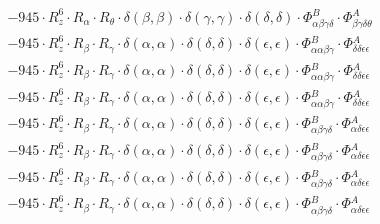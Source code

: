 \documentclass{article}
\begin{document}
\begin{subequations}
\begin{gather}
\begin{array}{c}
 \\[0.2em] 		 - 945 \cdot R_{z}^{6} \cdot R_{\alpha{}} \cdot R_{\theta{}} \cdot \delta{}\left(\beta{}, \beta{}\right) \cdot \delta{}\left(\gamma{}, \gamma{}\right) \cdot \delta{}\left(\delta{}, \delta{}\right) \cdot \Phi{}^{B}_{\alpha{}\beta{}\gamma{}\delta{}} \cdot \Phi{}^{A}_{\beta{}\gamma{}\delta{}\theta{}} 
 \\[0.2em] 		 - 945 \cdot R_{z}^{6} \cdot R_{\beta{}} \cdot R_{\gamma{}} \cdot \delta{}\left(\alpha{}, \alpha{}\right) \cdot \delta{}\left(\delta{}, \delta{}\right) \cdot \delta{}\left(\epsilon{}, \epsilon{}\right) \cdot \Phi{}^{B}_{\alpha{}\alpha{}\beta{}\gamma{}} \cdot \Phi{}^{A}_{\delta{}\delta{}\epsilon{}\epsilon{}} 
 \\[0.2em] 		 - 945 \cdot R_{z}^{6} \cdot R_{\beta{}} \cdot R_{\gamma{}} \cdot \delta{}\left(\alpha{}, \alpha{}\right) \cdot \delta{}\left(\delta{}, \delta{}\right) \cdot \delta{}\left(\epsilon{}, \epsilon{}\right) \cdot \Phi{}^{B}_{\alpha{}\alpha{}\beta{}\gamma{}} \cdot \Phi{}^{A}_{\delta{}\delta{}\epsilon{}\epsilon{}} 
 \\[0.2em] 		 - 945 \cdot R_{z}^{6} \cdot R_{\beta{}} \cdot R_{\gamma{}} \cdot \delta{}\left(\alpha{}, \alpha{}\right) \cdot \delta{}\left(\delta{}, \delta{}\right) \cdot \delta{}\left(\epsilon{}, \epsilon{}\right) \cdot \Phi{}^{B}_{\alpha{}\alpha{}\beta{}\gamma{}} \cdot \Phi{}^{A}_{\delta{}\delta{}\epsilon{}\epsilon{}} 
 \\[0.2em] 		 - 945 \cdot R_{z}^{6} \cdot R_{\beta{}} \cdot R_{\gamma{}} \cdot \delta{}\left(\alpha{}, \alpha{}\right) \cdot \delta{}\left(\delta{}, \delta{}\right) \cdot \delta{}\left(\epsilon{}, \epsilon{}\right) \cdot \Phi{}^{B}_{\alpha{}\beta{}\gamma{}\delta{}} \cdot \Phi{}^{A}_{\alpha{}\delta{}\epsilon{}\epsilon{}} 
 \\[0.2em] 		 - 945 \cdot R_{z}^{6} \cdot R_{\beta{}} \cdot R_{\gamma{}} \cdot \delta{}\left(\alpha{}, \alpha{}\right) \cdot \delta{}\left(\delta{}, \delta{}\right) \cdot \delta{}\left(\epsilon{}, \epsilon{}\right) \cdot \Phi{}^{B}_{\alpha{}\beta{}\gamma{}\delta{}} \cdot \Phi{}^{A}_{\alpha{}\delta{}\epsilon{}\epsilon{}} 
 \\[0.2em] 		 - 945 \cdot R_{z}^{6} \cdot R_{\beta{}} \cdot R_{\gamma{}} \cdot \delta{}\left(\alpha{}, \alpha{}\right) \cdot \delta{}\left(\delta{}, \delta{}\right) \cdot \delta{}\left(\epsilon{}, \epsilon{}\right) \cdot \Phi{}^{B}_{\alpha{}\beta{}\gamma{}\delta{}} \cdot \Phi{}^{A}_{\alpha{}\delta{}\epsilon{}\epsilon{}} 
 \\[0.2em] 		 - 945 \cdot R_{z}^{6} \cdot R_{\beta{}} \cdot R_{\gamma{}} \cdot \delta{}\left(\alpha{}, \alpha{}\right) \cdot \delta{}\left(\delta{}, \delta{}\right) \cdot \delta{}\left(\epsilon{}, \epsilon{}\right) \cdot \Phi{}^{B}_{\alpha{}\beta{}\gamma{}\delta{}} \cdot \Phi{}^{A}_{\alpha{}\delta{}\epsilon{}\epsilon{}} 

\end{array}
\end{gather}
\end{subequations}
\end{document}
